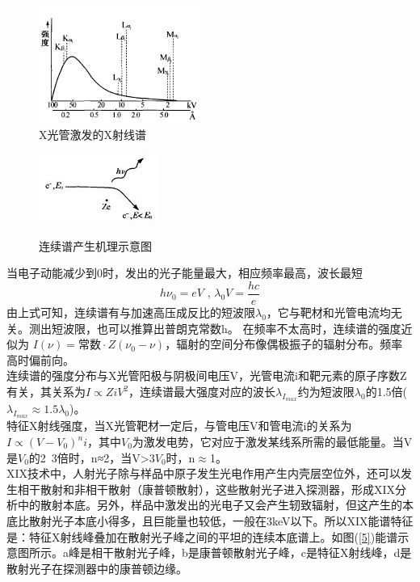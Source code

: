\documentclass[a4paper]{article}
\begin{document}
\begin{figure}[!h]
\centering
\begin{minipage}[!h]{0.48\textwidth}
\begin{center}
\includegraphics{fig/X.jpg}\\
\caption{X光管激发的X射线谱}\label{X}
\end{center}
\end{minipage}
\begin{minipage}[!h]{0.48\textwidth}
\begin{center}
\includegraphics{fig/CS.jpg}\\
\end{center}
\caption{连续谱产生机理示意图}\label{CS}
\end{minipage}
\end{figure}
当电子动能减少到0时，发出的光子能量最大，相应频率最高，波长最短
\begin{equation}
h\nu_0 = eV\text{ , }\lambda_0 V = \frac{hc}{e}
\end{equation}
由上式可知，连续谱有与加速高压成反比的短波限$\lambda_0$，它与靶材和光管电流均无关。测出短波限，也可以推算出普朗克常数h。
在频率不太高时，连续谱的强度近似为
$I(\nu)=\text{常数}\cdot Z(\nu_0-\nu)$，辐射的空间分布像偶极振子的辐射分布。频率高时偏前向。\\
连续谱的强度分布与X光管阳极与阴极间电压V，光管电流i和靶元素的原子序数Z有关，其关系为$I\propto ZiV^2$，连续谱最大强度对应的波长$\lambda_{I_{max}}$约为短波限$\lambda_0$的1.5倍($\lambda_{I_{max}}\approx 1.5\lambda_0$)。\\
特征X射线强度，当X光管靶材一定后，与管电压V和管电流i的关系为$I \propto (V-V_0)^n i$，其中$V_0$为激发电势，它对应于激发某线系所需的最低能量。当V是$V_0$的2~3倍时，n≈2，当V>3$V_0$时，n$\approx$1。\\
XIX技术中，人射光子除与样品中原子发生光电作用产生内壳层空位外，还可以发生相干散射和非相干散射（康普顿散射），这些散射光子进入探测器，形成XIX分析中的散射本底。另外，样品中激发出的光电子又会产生轫致辐射，但这产生的本底比散射光子本底小得多，且巨能量也较低，一般在3keV以下。所以XIX能谱特征是：特征X射线峰叠加在散射光子峰之间的平坦的连续本底谱上。如图(\ref{5})能谱示意图所示。a峰是相干散射光子峰，b是康普顿散射光子峰，c是特征X射线峰，d是散射光子在探测器中的康普顿边缘。
\end{document}
